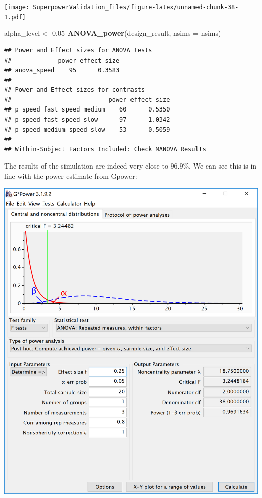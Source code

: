 \documentclass[]{book}
\newenvironment{Shaded}{\begin{snugshade}}{\end{snugshade}}
\newcommand{\DataTypeTok}[1]{\textcolor[rgb]{0.13,0.29,0.53}{#1}}
\newcommand{\FloatTok}[1]{\textcolor[rgb]{0.00,0.00,0.81}{#1}}
\newcommand{\KeywordTok}[1]{\textcolor[rgb]{0.13,0.29,0.53}{\textbf{#1}}}
\newcommand{\NormalTok}[1]{#1}
\newcommand{\StringTok}[1]{\textcolor[rgb]{0.31,0.60,0.02}{#1}}
\begin{document}
\texttt{[image: SuperpowerValidation\_files/figure-latex/unnamed-chunk-38-1.pdf]}

\begin{Shaded}
\begin{Highlighting}[]
\NormalTok{alpha_level <-}\StringTok{ }\FloatTok{0.05}
\KeywordTok{ANOVA_power}\NormalTok{(design_result, }\DataTypeTok{nsims =}\NormalTok{ nsims)}
\end{Highlighting}
\end{Shaded}

\begin{verbatim}
## Power and Effect sizes for ANOVA tests
##             power effect_size
## anova_speed    95      0.3583
## 
## Power and Effect sizes for contrasts
##                           power effect_size
## p_speed_fast_speed_medium    60      0.5350
## p_speed_fast_speed_slow      97      1.0342
## p_speed_medium_speed_slow    53      0.5059
## 
## Within-Subject Factors Included: Check MANOVA Results
\end{verbatim}

The results of the simulation are indeed very close to 96.9\%. We can see this is in line with the power estimate from Gpower:

\includegraphics{screenshots/gpower_12.png}
\end{document}
